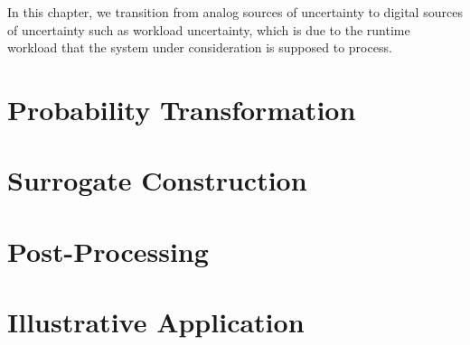 In this chapter, we transition from analog sources of uncertainty to digital
sources of uncertainty such as workload uncertainty, which is due to the runtime
workload that the system under consideration is supposed to process.

\section{\introductiontitle}

\section{\exampletitle}

\section{\problemtitle}

\section{\priortitle}

\section{\solutiontitle}

\section{Probability Transformation}

\section{Surrogate Construction}

\section{Post-Processing}

\section{Illustrative Application}

\section{\resultstitle}

\section{\conclusiontitle}
